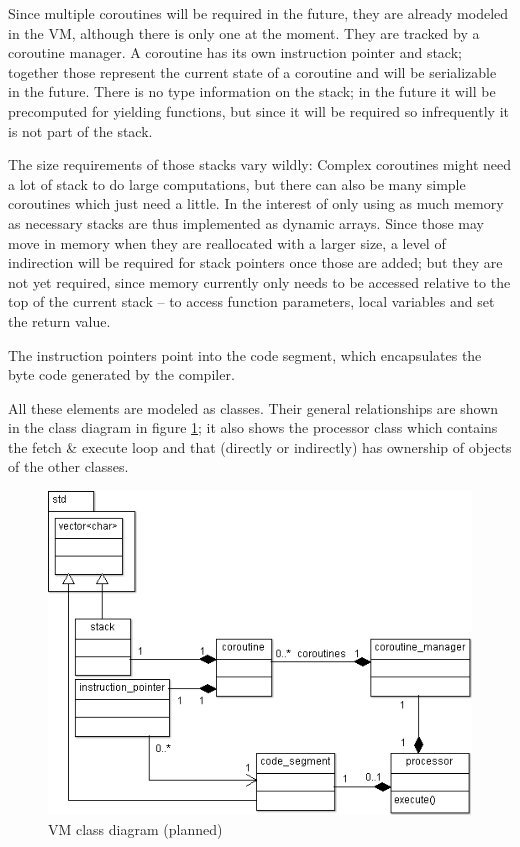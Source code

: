 			Since multiple coroutines will be required in the future, they are already modeled in the VM, although there is only one at the moment. They are tracked by a coroutine manager. A coroutine has its own instruction pointer and stack; together those represent the current state of a coroutine and will be serializable in the future. There is no type information on the stack; in the future it will be precomputed for yielding functions, but since it will be required so infrequently it is not part of the stack.
			
			The size requirements of those stacks vary wildly: Complex coroutines might need a lot of stack to do large computations, but there can also be many simple coroutines which just need a little. In the interest of only using as much memory as necessary stacks are thus implemented as dynamic arrays. Since those may move in memory when they are reallocated with a larger size, a level of indirection will be required for stack pointers once those are added; but they are not yet required, since memory currently only needs to be accessed relative to the top of the current stack -- to access function parameters, local variables and set the return value.
			
			The instruction pointers point into the code segment, which encapsulates the byte code generated by the compiler.
			
			All these elements are modeled as classes. Their general relationships are shown in the class diagram in figure \ref{fig:vm_class_diagram}; it also shows the processor class which contains the fetch \& execute loop and that (directly or indirectly) has ownership of objects of the other classes.
			
			\begin{figure}
			\centering
			\includegraphics[width=\textwidth]{figures/vm_classes_cropped}
			\caption{VM class diagram (planned)}
			\label{fig:vm_class_diagram}
			\end{figure}

